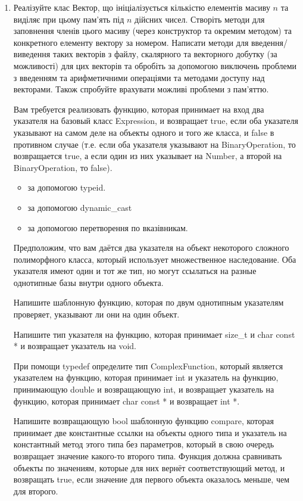 \documentclass[]{article}
\begin{document}
\begin{enumerate}
\def\labelenumi{\arabic{enumi}.}
\item
  Реалізуйте клас Вектор, що ініціалізується кількістю елементів масиву
  \(n\) та виділяє при цьому пам'ять під \(n\) дійсних чисел. Створіть
  методи для заповнення членів цього масиву (через конструктор та
  окремим методом) та конкретного елементу вектору за номером. Написати
  методи для введення/виведення таких векторів з файлу, скалярного та
  векторного добутку (за можливості) для цих векторів та обробіть за
  допомогою виключень проблеми з введенням та арифметичними операціями
  та методами доступу над векторами. Також спробуйте врахувати можливі
  проблеми з пам'яттю.



Вам требуется реализовать функцию, которая принимает на вход два указателя на базовый класс Expression, и возвращает true, если оба указателя указывают на самом деле на объекты одного и того же класса, и false в противном случае (т.е. если оба указателя указывают на BinaryOperation, то возвращается true, а если один из них указывает на Number, а второй на BinaryOperation, то false).

\begin{itemize}
\item
 за допомогою typeid.
\item
за допомогою dynamic_cast 
\item
за допомогою перетворення по вказівникам.
\end{itemize}


Предположим, что вам даётся два указателя на объект некоторого сложного полиморфного класса, который использует множественное наследование. Оба указателя имеют один и тот же тип, но могут ссылаться на разные однотипные базы внутри одного объекта.

Напишите шаблонную функцию, которая по двум однотипным указателям проверяет, указывают ли они на один объект.


Напишите тип указателя на функцию, которая принимает size_t и char const * и возвращает указатель на void.

При помощи typedef определите тип ComplexFunction, который является указателем на функцию, которая принимает int и указатель на функцию, принимающую double и возвращающую int, и возвращает указатель на функцию, которая принимает char const * и возвращает int *.

Напишите возвращающую bool шаблонную функцию compare, которая принимает две константные ссылки на объекты одного типа и указатель на константный метод этого типа без параметров, который в свою очередь возвращает значение какого-то второго типа. Функция должна сравнивать объекты по значениям, которые для них вернёт соответствующий метод, и возвращать true, если значение для первого объекта оказалось меньше, чем для второго.


\end{enumerate}
\end{document}
